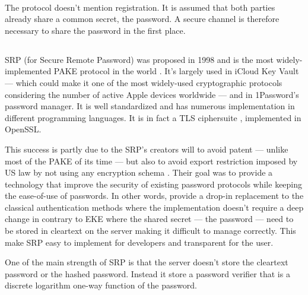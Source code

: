\documentclass[../report.tex]{subfiles}
\begin{document}

\paragraph{}
The protocol doesn't mention registration. It is assumed that both parties already share a common secret, the password. A secure channel is therefore necessary to share the password in the first place.





\subsection{}

\paragraph{}

SRP \cite{SRP_Paper, SRP_6_Paper} (for Secure Remote Password) was proposed in 1998 and is the most widely-implemented PAKE protocol in the world \cite{PAKE_Green_blog}.
It's largely used in iCloud Key Vault --- which could make it one of the most widely-used cryptographic protocols \cite{PAKE_Green_blog} considering the number of active Apple devices worldwide --- and in 1Password's password manager.
It is well standardized and has numerous implementation in different programming languages. %
It is in fact a TLS ciphersuite \cite{SRP_RFC_3}, implemented in OpenSSL.

This success is partly due to the SRP's creators will to avoid patent --- unlike most of the PAKE of its time --- but also to avoid export restriction imposed by US law by not using any encryption schema \cite{SRP_Formal_Analysis}.
Their goal was to provide a technology that improve the security of existing password protocols while keeping the ease-of-use of passwords. In other words, provide a drop-in replacement to the classical authentication methods where the implementation doesn't require a deep change in contrary to EKE where the shared secret --- the password --- need to be stored in cleartext on the server making it difficult to manage correctly.
This make SRP easy to implement for developers and transparent for the user.

One of the main strength of SRP is that the server doesn't store the cleartext password or the hashed password. Instead it store a password verifier that is a discrete logarithm one-way function of the password.
\end{document}
